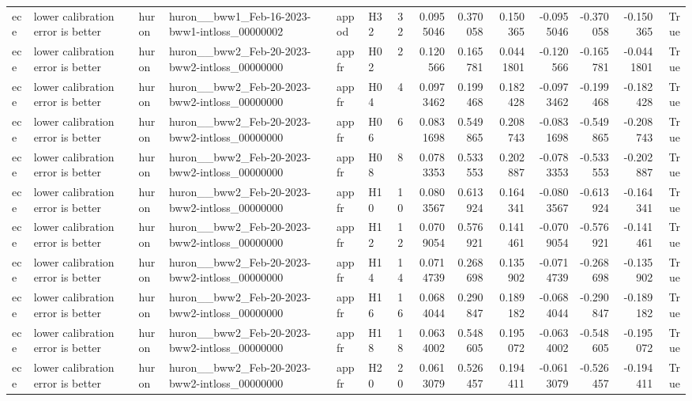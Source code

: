 \begin{longtable}{llllllrrrrrrrr}
ece & lower calibration error is better & huron & huron\_\_bww1\_Feb-16-2023-bww1-intloss\_00000002 & appod & H32 & 32 & 0.0955046 & 0.370058 & 0.150365 & -0.0955046 & -0.370058 & -0.150365 & True \\
ece & lower calibration error is better & huron & huron\_\_bww2\_Feb-20-2023-bww2-intloss\_00000000 & appfr & H02 & 2 & 0.120566 & 0.165781 & 0.0441801 & -0.120566 & -0.165781 & -0.0441801 & True \\
ece & lower calibration error is better & huron & huron\_\_bww2\_Feb-20-2023-bww2-intloss\_00000000 & appfr & H04 & 4 & 0.0973462 & 0.199468 & 0.182428 & -0.0973462 & -0.199468 & -0.182428 & True \\
ece & lower calibration error is better & huron & huron\_\_bww2\_Feb-20-2023-bww2-intloss\_00000000 & appfr & H06 & 6 & 0.0831698 & 0.549865 & 0.208743 & -0.0831698 & -0.549865 & -0.208743 & True \\
ece & lower calibration error is better & huron & huron\_\_bww2\_Feb-20-2023-bww2-intloss\_00000000 & appfr & H08 & 8 & 0.0783353 & 0.533553 & 0.202887 & -0.0783353 & -0.533553 & -0.202887 & True \\
ece & lower calibration error is better & huron & huron\_\_bww2\_Feb-20-2023-bww2-intloss\_00000000 & appfr & H10 & 10 & 0.0803567 & 0.613924 & 0.164341 & -0.0803567 & -0.613924 & -0.164341 & True \\
ece & lower calibration error is better & huron & huron\_\_bww2\_Feb-20-2023-bww2-intloss\_00000000 & appfr & H12 & 12 & 0.0709054 & 0.576921 & 0.141461 & -0.0709054 & -0.576921 & -0.141461 & True \\
ece & lower calibration error is better & huron & huron\_\_bww2\_Feb-20-2023-bww2-intloss\_00000000 & appfr & H14 & 14 & 0.0714739 & 0.268698 & 0.135902 & -0.0714739 & -0.268698 & -0.135902 & True \\
ece & lower calibration error is better & huron & huron\_\_bww2\_Feb-20-2023-bww2-intloss\_00000000 & appfr & H16 & 16 & 0.0684044 & 0.290847 & 0.189182 & -0.0684044 & -0.290847 & -0.189182 & True \\
ece & lower calibration error is better & huron & huron\_\_bww2\_Feb-20-2023-bww2-intloss\_00000000 & appfr & H18 & 18 & 0.0634002 & 0.548605 & 0.195072 & -0.0634002 & -0.548605 & -0.195072 & True \\
ece & lower calibration error is better & huron & huron\_\_bww2\_Feb-20-2023-bww2-intloss\_00000000 & appfr & H20 & 20 & 0.0613079 & 0.526457 & 0.194411 & -0.0613079 & -0.526457 & -0.194411 & True \\

\end{longtable}
